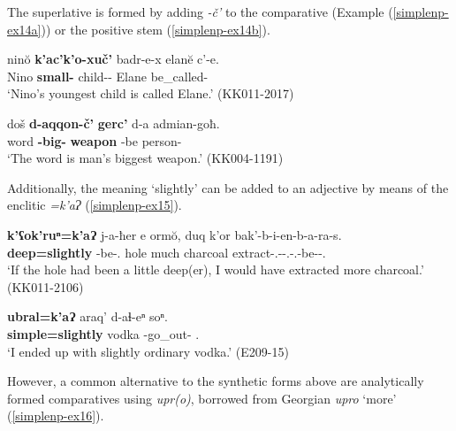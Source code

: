 The superlative is formed by adding \textit{-č'} to the comparative (Example (\ref{simplenp-ex14a})) or the positive stem (\ref{simplenp-ex14b}).

\begin{exe}
	\ex\label{simplenp-ex14}
	\begin{xlist}
		
		\ex\label{simplenp-ex14a}
		\gll nin\u{o} \textbf{k'ac'k'o-xuč'} badr-e-x elan\u{e} c'-e.\\
		Nino \textbf{small-{\Superl}} child-{\Obl}-{\Cont} Elane be\_called-{\Npst} \\
		\trans `Nino's youngest child is called Elane.'
		\hfill (KK011-2017)
		
		\ex\label{simplenp-ex14b}
		\gll doš \textbf{d-aqqon-č'} \textbf{gerc'} d-a admian-goħ. \\
		word \textbf{{\D}-big-{\Superl}} \textbf{weapon} {\D}-be person-{\Adess} \\
		\trans `The word is man's biggest weapon.'
		\hfill (KK004-1191)
		
	\end{xlist}
\end{exe}

Additionally,  the meaning `slightly' can be added to an adjective by means of the enclitic \textit{=k'aɁ} (\ref{simplenp-ex15}). 


\begin{exe}
	\ex\label{simplenp-ex15}
	\begin{xlist}
		
		\ex\label{simplenp-ex15a}
		\gll \textbf{k'ʕok'ruⁿ=k'aɁ} j-a-ħer e orm\u{o}, duq k'or bak'-b-i-en-b-a-ra-s. \\
		\textbf{deep=slightly} {\J}-be-{\Cond}.{\Aor} {\Prox} hole much charcoal extract-{\B}.{\Sg}-{\Tr}-{\Ptcp}.{\Aor}-{\B}.{\Sg}-be-{{\Imprf}}-{\Fsg}.{\Nom} \\
		\trans `If the hole had been a little deep(er), I would have extracted more charcoal.'
		\hfill (KK011-2106)
		
		\ex\label{simplenp-ex15b}
		\gll \textbf{ubral=k'aɁ} araq' d-aɬ-eⁿ soⁿ.\\
		\textbf{simple=slightly} vodka {\D}-go\_out-{\Aor} {\Fsg}.{\Dat} \\
		\trans `I ended up with slightly ordinary vodka.'
		\hfill (E209-15)
		
	\end{xlist}
\end{exe}


However, a common alternative to the synthetic forms above are analytically formed comparatives using \textit{upr(o)}, borrowed from Georgian \textit{upro} `more' (\ref{simplenp-ex16}).

